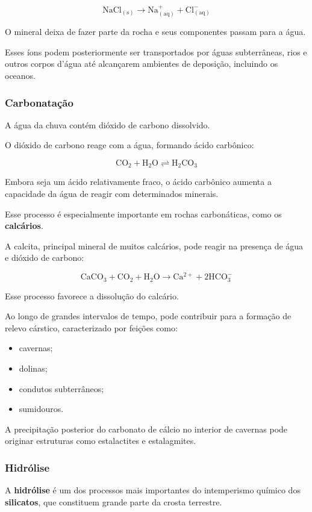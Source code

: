 \documentclass[a4paper,12pt]{article}
\theoremstyle{definition}
\theoremstyle{definition}
\theoremstyle{definition}
\begin{document}
\[
\mathrm{NaCl_{(s)}
\rightarrow
Na^+_{(aq)} + Cl^-_{(aq)}}
\]

O mineral deixa de fazer parte da rocha e seus componentes passam para a água.

Esses íons podem posteriormente ser transportados por águas subterrâneas, rios e outros corpos d'água até alcançarem ambientes de deposição, incluindo os oceanos.

\subsubsection{Carbonatação}

A água da chuva contém dióxido de carbono dissolvido.

O dióxido de carbono reage com a água, formando ácido carbônico:

\[
\mathrm{CO_2 + H_2O
\rightleftharpoons
H_2CO_3}
\]

Embora seja um ácido relativamente fraco, o ácido carbônico aumenta a capacidade da água de reagir com determinados minerais.

Esse processo é especialmente importante em rochas carbonáticas, como os \textbf{calcários}.

A calcita, principal mineral de muitos calcários, pode reagir na presença de água e dióxido de carbono:

\[
\mathrm{CaCO_3 + CO_2 + H_2O
\rightarrow
Ca^{2+} + 2HCO_3^-}
\]

Esse processo favorece a dissolução do calcário.

Ao longo de grandes intervalos de tempo, pode contribuir para a formação de relevo cárstico, caracterizado por feições como:

\begin{itemize}
    \item cavernas;
    \item dolinas;
    \item condutos subterrâneos;
    \item sumidouros.
\end{itemize}

A precipitação posterior do carbonato de cálcio no interior de cavernas pode originar estruturas como estalactites e estalagmites.

\subsubsection{Hidrólise}

A \textbf{hidrólise} é um dos processos mais importantes do intemperismo químico dos \textbf{silicatos}, que constituem grande parte da crosta terrestre.
\end{document}
